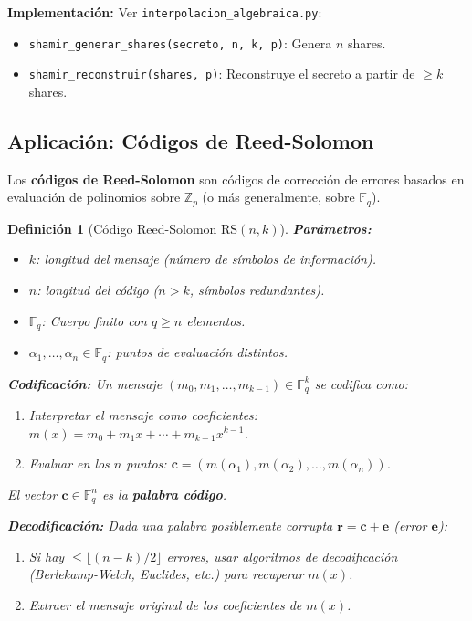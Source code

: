 \documentclass[a4paper,11pt]{report}
\newtheorem{definition}[theorem]{Definición}
\begin{document}
\textbf{Implementación:} Ver \texttt{interpolacion\_algebraica.py}:
\begin{itemize}
\item \texttt{shamir\_generar\_shares(secreto, n, k, p)}: Genera $n$ shares.
\item \texttt{shamir\_reconstruir(shares, p)}: Reconstruye el secreto a partir de $\geq k$ shares.
\end{itemize}

\subsection{Aplicación: Códigos de Reed-Solomon}

Los \textbf{códigos de Reed-Solomon} son códigos de corrección de errores basados en evaluación de polinomios sobre $\mathbb{Z}_p$ (o más generalmente, sobre $\mathbb{F}_q$).

\begin{definition}[Código Reed-Solomon $\text{RS}(n,k)$]
\textbf{Parámetros:}
\begin{itemize}
\item $k$: longitud del mensaje (número de símbolos de información).
\item $n$: longitud del código ($n > k$, símbolos redundantes).
\item $\mathbb{F}_q$: Cuerpo finito con $q \geq n$ elementos.
\item $\alpha_1, \ldots, \alpha_n \in \mathbb{F}_q$: puntos de evaluación distintos.
\end{itemize}

\textbf{Codificación:} Un mensaje $(m_0, m_1, \ldots, m_{k-1}) \in \mathbb{F}_q^k$ se codifica como:
\begin{enumerate}
\item Interpretar el mensaje como coeficientes: $m(x) = m_0 + m_1 x + \cdots + m_{k-1} x^{k-1}$.
\item Evaluar en los $n$ puntos: $\mathbf{c} = (m(\alpha_1), m(\alpha_2), \ldots, m(\alpha_n))$.
\end{enumerate}
El vector $\mathbf{c} \in \mathbb{F}_q^n$ es la \textbf{palabra código}.

\textbf{Decodificación:} Dada una palabra posiblemente corrupta $\mathbf{r} = \mathbf{c} + \mathbf{e}$ (error $\mathbf{e}$):
\begin{enumerate}
\item Si hay $\leq \lfloor (n-k)/2 \rfloor$ errores, usar algoritmos de decodificación (Berlekamp-Welch, Euclides, etc.) para recuperar $m(x)$.
\item Extraer el mensaje original de los coeficientes de $m(x)$.
\end{enumerate}
\end{definition}
\end{document}

